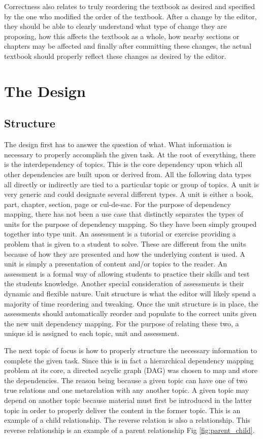 Correctness also relates to truly reordering the textbook as desired and specified by the one who modified the order of the textbook. After a change by the editor, they should be able to clearly understand what type of change they are proposing, how this affects the textbook as a whole, how nearby sections or chapters may be affected and finally after committing these changes, the actual textbook should properly reflect these changes as desired by the editor. 

\section{The Design}

\subsection{Structure}

The design first has to answer the question of what. What information is necessary  to properly accomplish the given task. At the root of everything, there is the interdependency of topics. This is the core dependency upon which all other dependencies are built upon or derived from. All the following data types all directly or indirectly are tied to a particular topic or group of topics. A unit is very generic and could designate several different types. A unit is either a book, part, chapter, section, page or cul-de-sac. For the purpose of dependency mapping, there has not been a use case that distinctly separates the types of units for the purpose of dependency mapping. So they have been simply grouped together into type unit. An assessment is a tutorial or exercise providing a problem that is given to a student to solve. These are different from the units because of how they are presented and how the underlying content is used. A unit is simply a presentation of content and/or topics to the reader. An assessment is a formal way of allowing students to practice their skills and test the students knowledge. Another special consideration of assessments is their dynamic and flexible nature. Unit structure is what the editor will likely spend a majority of time reordering and tweaking. Once the unit structure is in place, the assessments should automatically reorder and populate to the correct units given the new unit dependency mapping. For the purpose of relating these two, a unique id is assigned to each topic, unit and assessment.

The next topic of focus is how to properly structure the necessary information to complete the given task. Since this is in fact a hierarchical dependency mapping problem at its core, a directed acyclic graph (DAG) was chosen to map and store the dependencies. The reason being because a given topic can have one of two true relations and one metarelation with any another topic. A given topic may depend on another topic because material must first be introduced in the latter topic in order to properly deliver the content in the former topic. This is an example of a child relationship. The reverse relation is also a relationship. This reverse relationship is an example of a parent relationship Fig \ref{fig:parent_child}.

